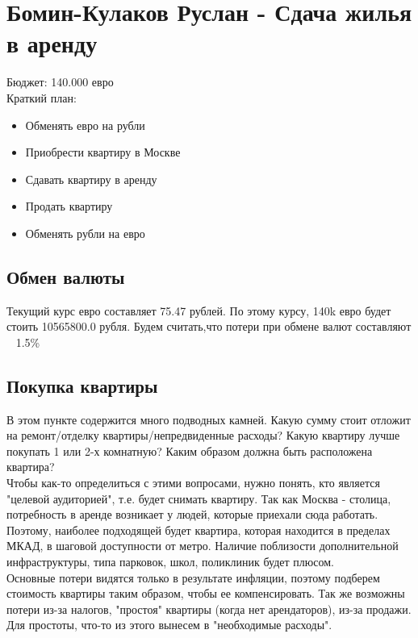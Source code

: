 \section{Бомин-Кулаков Руслан - Сдача жилья в аренду}
Бюджет: 140.000 евро \\
Краткий план:
\begin{itemize}
	\item Обменять евро на рубли
	\item Приобрести квартиру в Москве
	\item Сдавать квартиру в аренду
	\item Продать квартиру
	\item Обменять рубли на евро
\end{itemize}


\subsection{Обмен валюты}
Текущий курс евро составляет 75.47 рублей. По этому курсу, 140k евро будет стоить 10565800.0 рубля. Будем считать,что потери при обмене валют составляют ~ 1.5\%

\subsection{Покупка квартиры}
В этом пункте содержится много подводных камней. Какую сумму стоит отложит на ремонт/отделку квартиры/непредвиденные расходы? Какую квартиру лучше покупать 1 или 2-х комнатную? Каким образом должна быть расположена квартира? \\

Чтобы как-то определиться с этими вопросами, нужно понять, кто является "целевой аудиторией", т.е. будет снимать квартиру. Так как Москва - столица, потребность в аренде возникает у людей, которые приехали сюда работать. Поэтому, наиболее подходящей будет квартира, которая находится в пределах МКАД, в шаговой доступности от метро. Наличие поблизости дополнительной инфраструктуры, типа парковок, школ, поликлиник будет плюсом. \\

Основные потери видятся только в результате инфляции, поэтому подберем стоимость квартиры таким образом, чтобы ее компенсировать. Так же возможны потери из-за налогов, "простоя" квартиры (когда нет арендаторов), из-за продажи. Для простоты, что-то из этого вынесем в "необходимые расходы".\\


